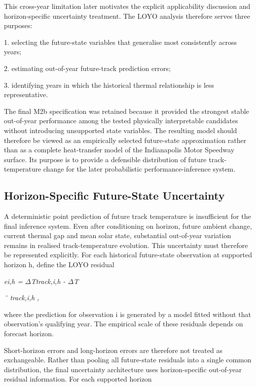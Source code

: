 This cross-year limitation later motivates the explicit applicability discussion and horizon-specific uncertainty treatment. The LOYO analysis therefore serves three purposes:

1. selecting the future-state variables that generalise most consistently across years;

2. estimating out-of-year future-track prediction errors;

3. identifying years in which the historical thermal relationship is less representative.

The final M2b specification was retained because it provided the strongest stable out-of-year performance among the tested physically interpretable candidates without introducing unsupported state variables. The resulting model should therefore be viewed as an empirically selected future-state approximation rather than as a complete heat-transfer model of the Indianapolis Motor Speedway surface. Its purpose is to provide a defensible distribution of future track-temperature change for the later probabilistic performance-inference system.

\subsection{Horizon-Specific Future-State Uncertainty}
A deterministic point prediction of future track temperature is insufficient for the final inference system. Even after conditioning on horizon, future ambient change, current thermal gap and mean solar state, substantial out-of-year variation remains in realised track-temperature evolution. This uncertainty must therefore be represented explicitly. For each historical future-state observation at supported horizon h, define the LOYO residual

\begin{center}\textit{ei,h = \ensuremath{\Delta}Ttrack,i,h - \ensuremath{\Delta}T}\end{center}

\begin{center}\textit{ˆ track,i,h ,}\end{center}

where the prediction for observation i is generated by a model fitted without that observation's qualifying year. The empirical scale of these residuals depends on forecast horizon.

Short-horizon errors and long-horizon errors are therefore not treated as exchangeable. Rather than pooling all future-state residuals into a single common distribution, the final uncertainty architecture uses horizon-specific out-of-year residual information. For each supported horizon

